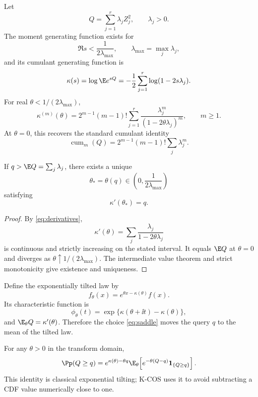 Let
\begin{equation}
Q=\sum_{j=1}^{r}\lambda_j Z_j^2,
\qquad \lambda_j>0.
\label{eq:Q}
\end{equation}
The moment generating function exists for
\[
\Re s < \frac{1}{2\lambda_{\max}},
\qquad
\lambda_{\max}=\max_j\lambda_j,
\]
and its cumulant generating function is
\begin{equation}
\kappa(s)=\log \E e^{sQ}
=-\frac12\sum_{j=1}^{r}\log(1-2s\lambda_j).
\label{eq:cgf}
\end{equation}
For real $\theta<1/(2\lambda_{\max})$,
\begin{equation}
\kappa^{(m)}(\theta)
=2^{m-1}(m-1)!\sum_{j=1}^{r}
\frac{\lambda_j^m}{(1-2\theta\lambda_j)^m},
\qquad m\ge1.
\label{eq:derivatives}
\end{equation}
At $\theta=0$, this recovers the standard cumulant identity
\[
\operatorname{cum}_m(Q)=2^{m-1}(m-1)!\sum_j\lambda_j^m.
\]

\begin{theorem}
\label{thm:saddle}
If $q>\E Q=\sum_j\lambda_j$, there exists a unique
\[
\theta_*=\theta(q)\in\left(0,\frac{1}{2\lambda_{\max}}\right)
\]
satisfying
\begin{equation}
\kappa'(\theta_*)=q.
\label{eq:saddle}
\end{equation}
\end{theorem}

\begin{proof}
By \eqref{eq:derivatives},
\[
\kappa'(\theta)=\sum_j\frac{\lambda_j}{1-2\theta\lambda_j}
\]
is continuous and strictly increasing on the stated interval. It equals $\E Q$ at $\theta=0$ and diverges as $\theta\uparrow1/(2\lambda_{\max})$. The intermediate value theorem and strict monotonicity give existence and uniqueness.
\end{proof}

Define the exponentially tilted law by
\begin{equation}
f_{\theta}(x)=e^{\theta x-\kappa(\theta)}f(x).
\label{eq:tilt-density}
\end{equation}
Its characteristic function is
\begin{equation}
\phi_{\theta}(t)
=\exp\{\kappa(\theta+\ii t)-\kappa(\theta)\},
\label{eq:tilt-cf}
\end{equation}
and $\E_{\theta}Q=\kappa'(\theta)$. Therefore the choice \eqref{eq:saddle} moves the query $q$ to the mean of the tilted law.

For any $\theta>0$ in the transform domain,
\begin{equation}
\Pp(Q\ge q)
=e^{\kappa(\theta)-\theta q}
\E_{\theta}\!\left[e^{-\theta(Q-q)}\mathbf 1_{\{Q\ge q\}}\right].
\label{eq:tilt-tail}
\end{equation}
This identity is classical exponential tilting; K-COS uses it to avoid subtracting a CDF value numerically close to one.

